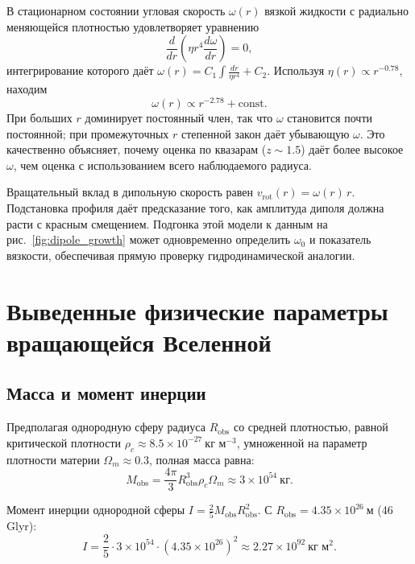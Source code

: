 \documentclass[11pt,a4paper]{article}
\begin{document}
	В стационарном состоянии угловая скорость \(\omega(r)\) вязкой жидкости с радиально меняющейся плотностью удовлетворяет уравнению
	\begin{equation}
		\frac{d}{dr}\left( \eta r^4 \frac{d\omega}{dr} \right) = 0,
	\end{equation}
	интегрирование которого даёт \(\omega(r) = C_1 \int \frac{dr}{\eta r^4} + C_2\). Используя \(\eta(r) \propto r^{-0.78}\), находим
	\begin{equation}
		\omega(r) \propto r^{-2.78} + \text{const}.
	\end{equation}
	При больших \(r\) доминирует постоянный член, так что \(\omega\) становится почти постоянной; при промежуточных \(r\) степенной закон даёт убывающую \(\omega\). Это качественно объясняет, почему оценка по квазарам (\(z\sim1.5\)) даёт более высокое \(\omega\), чем оценка с использованием всего наблюдаемого радиуса.
	
	Вращательный вклад в дипольную скорость равен \(v_{\mathrm{rot}}(r) = \omega(r) \, r\). Подстановка профиля даёт предсказание того, как амплитуда диполя должна расти с красным смещением. Подгонка этой модели к данным на рис.~\ref{fig:dipole_growth} может одновременно определить \(\omega_0\) и показатель вязкости, обеспечивая прямую проверку гидродинамической аналогии.
	
	\section{Выведенные физические параметры вращающейся Вселенной}
	
	\subsection{Масса и момент инерции}
	
	Предполагая однородную сферу радиуса \(R_{\text{obs}}\) со средней плотностью, равной критической плотности \(\rho_c \approx 8.5\times10^{-27}\ \text{кг м}^{-3}\), умноженной на параметр плотности материи \(\Omega_m \approx 0.3\), полная масса равна:
	\begin{equation}
		M_{\text{obs}} = \frac{4\pi}{3} R_{\text{obs}}^3 \rho_c \Omega_m \approx 3 \times 10^{54}\ \text{кг}.
	\end{equation}
	
	Момент инерции однородной сферы \(I = \frac{2}{5} M_{\text{obs}} R_{\text{obs}}^2\). С \(R_{\text{obs}} = 4.35\times10^{26}\ \text{м}\) (46 Glyr):
	\begin{equation}
		I = \frac{2}{5} \cdot 3\times10^{54} \cdot (4.35\times10^{26})^2 \approx 2.27 \times 10^{92}\ \text{кг м}^2.
	\end{equation}
	
\end{document}
